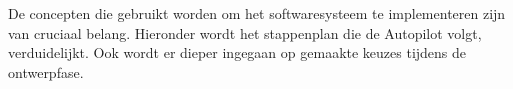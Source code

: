 \\
\\
\noindent
De concepten die gebruikt worden om het softwaresysteem te implementeren zijn van cruciaal belang. Hieronder wordt het stappenplan die de Autopilot volgt, verduidelijkt. Ook wordt er dieper ingegaan op gemaakte keuzes tijdens de ontwerpfase. 


